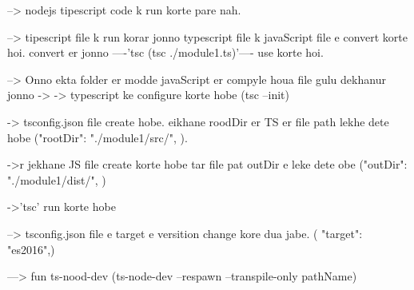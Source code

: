 --> nodejs tipescript code k run korte pare nah.

--> tipescript file k run korar jonno typescript file k javaScript file e convert korte hoi.
convert er jonno ----'tsc \pathName\fileName (tsc ./module1\src\index.ts)'---- use korte hoi.

--> Onno ekta folder er modde javaScript er compyle houa file gulu dekhanur jonno ->
    -> typescript ke configure korte hobe (tsc --init)

    -> tsconfig.json file create hobe. eikhane roodDir er TS er file path lekhe dete hobe ("rootDir": "./module1/src/", ). 

    ->r jekhane JS file create korte hobe tar file pat outDir e leke dete obe ("outDir": "./module1/dist/", )

    ->'tsc' run korte hobe

--> tsconfig.json file e target e versition change kore dua jabe. ( "target": "es2016",)


---> fun ts-nood-dev  (ts-node-dev --respawn --transpile-only pathName)